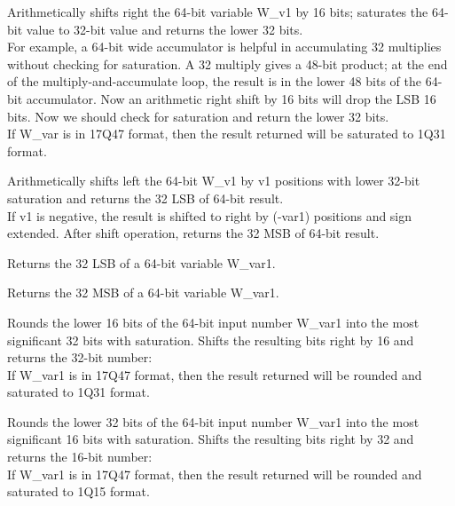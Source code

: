 
Arithmetically shifts right the 64-bit variable W\_v1 by 16 bits; saturates the 64-bit value to 32-bit value and returns the lower 32 bits.\\
For example, a 64-bit wide accumulator is helpful in accumulating 32 multiplies without checking for saturation.
A 32 multiply gives a 48-bit product; at the end of the multiply-and-accumulate loop, the result is in the lower 48 bits of the 64-bit accumulator.
Now an arithmetic right shift by 16 bits will drop the LSB 16 bits.
Now we should check for saturation and return the lower 32 bits.\\
If W\_var is in 17Q47 format, then the result returned will be saturated to 1Q31 format.


Arithmetically shifts left the 64-bit W\_v1 by v1 positions with lower 32-bit saturation and returns the 32 LSB of 64-bit result.\\
If v1 is negative, the result is shifted to right by (-var1) positions and sign extended.
After shift operation, returns the 32 MSB of 64-bit result.


Returns the 32 LSB of a 64-bit variable W\_var1.


Returns the 32 MSB of a 64-bit variable W\_var1.


Rounds the lower 16 bits of the 64-bit input number W\_var1 into the most significant 32 bits with saturation.
Shifts the resulting bits right by 16 and returns the 32-bit number:\\
If W\_var1 is in 17Q47 format, then the result returned will be rounded and saturated to 1Q31 format.


Rounds the lower 32 bits of the 64-bit input number W\_var1 into the most significant 16 bits with saturation.
Shifts the resulting bits right by 32 and returns the 16-bit number:\\
If W\_var1 is in 17Q47 format, then the result returned will be rounded and saturated to 1Q15 format.

